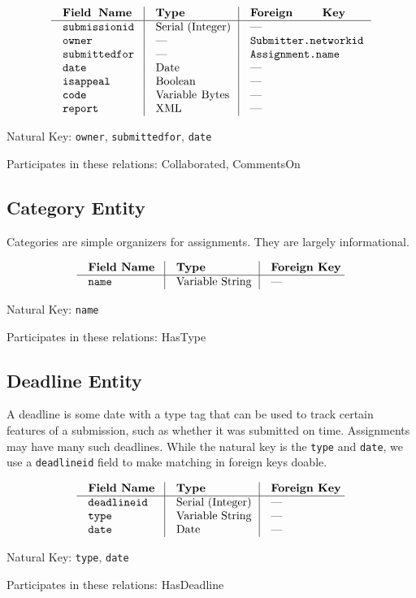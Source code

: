 $$\vbox{
  \offinterlineskip
  \halign{
    \strut \quad {\tt #}  & \vrule\quad #  & \vrule\quad # \cr
    {\bf Field Name}  & {\bf Type}  & {\bf Foreign Key}\cr
    \noalign{\hrule}    
    submissionid & Serial (Integer) & --- \cr
    owner  & ---  & {\tt Submitter.networkid} \cr
    submittedfor  & ---  & {\tt Assignment.name} \cr
    date  & Date  & --- \cr
    isappeal  & Boolean  & --- \cr
    code  & Variable Bytes  & --- \cr
    report  & XML  & --- \cr
  }
}$$

{\noindent
Natural Key: {\tt owner}, {\tt submittedfor}, {\tt date}\par\noindent
Participates in these relations: Collaborated, CommentsOn \par}

\subsection{Category Entity}
Categories are simple organizers for assignments. 
They are largely informational.

$$\vbox{
  \offinterlineskip
  \halign{
    \strut \quad {\tt #}  & \vrule\quad #  & \vrule\quad # \cr
    {\bf Field Name}  & {\bf Type}  & {\bf Foreign Key}\cr
    \noalign{\hrule}    
    name  & Variable String  & --- \cr
  }
}$$

{\noindent
Natural Key: {\tt name}\par\noindent
Participates in these relations: HasType \par}

\subsection{Deadline Entity}
A deadline is some date with a type tag that can be used to track certain
features of a submission, such as whether it was submitted on time.
Assignments may have many such deadlines. While the natural key is 
the {\tt type} and {\tt date}, we use a {\tt deadlineid} field to make 
matching in foreign keys doable.

$$\vbox{
  \offinterlineskip
  \halign{
    \strut \quad {\tt #}  & \vrule\quad #  & \vrule\quad # \cr
    {\bf Field Name}  & {\bf Type}  & {\bf Foreign Key}\cr
    \noalign{\hrule}
    deadlineid & Serial (Integer) & --- \cr
    type  & Variable String  & --- \cr
    date  & Date  & --- \cr
  }
}$$

{\noindent
Natural Key: {\tt type}, {\tt date}\par\noindent
Participates in these relations: HasDeadline \par}


